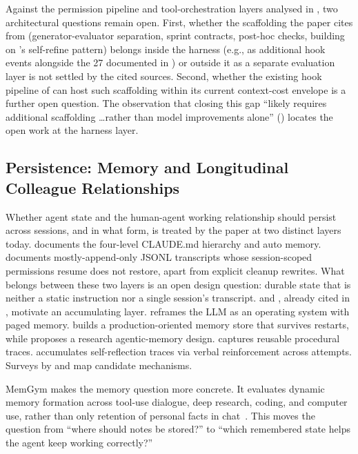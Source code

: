 Against the permission pipeline and tool-orchestration layers analysed in , two architectural questions remain open. First, whether the scaffolding the paper cites from \citet{anthropic2026harness} (generator-evaluator separation, sprint contracts, post-hoc checks, building on \citet{madaan2023selfrefine}'s self-refine pattern) belongs inside the harness (e.g., as additional hook events alongside the 27 documented in ) or outside it as a separate evaluation layer is not settled by the cited sources. Second, whether the existing hook pipeline of  can host such scaffolding within its current context-cost envelope is a further open question. The observation that closing this gap ``likely requires additional scaffolding \ldots rather than model improvements alone'' () locates the open work at the harness layer.

\subsection{Persistence: Memory and Longitudinal Colleague Relationships}
\label{sec:future:persistence}

Whether agent state and the human-agent working relationship should persist across sessions, and in what form, is treated by the paper at two distinct layers today.  documents the four-level CLAUDE.md hierarchy and auto memory.  documents mostly-append-only JSONL transcripts whose session-scoped permissions resume does not restore, apart from explicit cleanup rewrites. What belongs between these two layers is an open design question: durable state that is neither a static instruction nor a single session's transcript. \citet{hu2025memory} and \citet{zhang2026ace}, already cited in , motivate an accumulating layer. \citet{packer2024memgpt} reframes the LLM as an operating system with paged memory. \citet{chhikara2025mem0} builds a production-oriented memory store that survives restarts, while \citet{xu2025amem} proposes a research agentic-memory design. \citet{wang2024agentworkflowmemory} captures reusable procedural traces. \citet{shinn2023reflexion} accumulates self-reflection traces via verbal reinforcement across attempts. Surveys by \citet{zhang2024memorysurvey} and \citet{huang2026rethinkingmemory} map candidate mechanisms.

MemGym makes the memory question more concrete. It evaluates dynamic memory formation across tool-use dialogue, deep research, coding, and computer use, rather than only retention of personal facts in chat~\citep{xu2026memgym}. This moves the question from ``where should notes be stored?'' to ``which remembered state helps the agent keep working correctly?''

